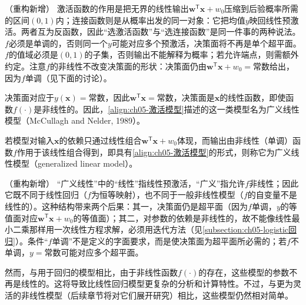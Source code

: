 \documentclass[../../main.tex]{subfiles}
\begin{document}
\begin{remark}（重构新增）
激活函数的作用是把无界的线性输出$\boldsymbol{w}^{\mathsf{T}}\boldsymbol{x}+w_0$压缩到后验概率所需的区间$(0,1)$内；连接函数则是从概率出发的同一对象：它把均值$y$映回线性预激活。两者互为反函数，因此“选激活函数”与“选连接函数”是同一件事的两种说法。$f$必须是单调的，否则同一个$y$可能对应多个预激活，决策面将不再是单个超平面。$f$的值域必须是$(0,1)$的子集，否则输出不能解释为概率；若允许端点，则需额外约定。注意$f$的非线性不改变决策面的形状：决策面仍由$\boldsymbol{w}^{\mathsf{T}}\boldsymbol{x}+w_0=\text{常数}$给出，因为$f$单调（见下面的讨论）。
\end{remark}

决策面对应于$y(\boldsymbol{x})=\text{常数}$，因此$\boldsymbol{w}^{\mathsf{T}}\boldsymbol{x}=\text{常数}$，决策面是$\boldsymbol{x}$的线性函数，即使函数$f(\cdot)$是非线性的。因此，\eqref{align:ch05-激活模型}描述的这一类模型名为广义线性模型（McCullagh and Nelder, 1989）。

\begin{definition}[广义线性模型]\label{definition:ch05-广义线性模型}
若模型对输入$\boldsymbol{x}$的依赖只通过线性组合$\boldsymbol{w}^{\mathsf{T}}\boldsymbol{x}+w_0$体现，而输出由非线性（单调）函数$f$作用于该线性组合得到，即具有\eqref{align:ch05-激活模型}的形式，则称它为广义线性模型（generalized linear model）。
\end{definition}

\begin{remark}（重构新增）
“广义线性”中的“线性”指线性预激活，“广义”指允许$f$非线性；因此它既不同于线性回归（$f$为恒等映射），也不同于一般非线性模型（$f$的自变量不是线性的）。这种结构带来两个后果：其一，决策面仍是超平面（因为$f$单调，$y$的等值面对应$\boldsymbol{w}^{\mathsf{T}}\boldsymbol{x}+w_0$的等值面）；其二，对参数的依赖是非线性的，故不能像线性最小二乘那样用一次线性方程求解，必须用迭代方法（见\cref{subsection:ch05-logistic回归}）。条件“$f$单调”不是定义的字面要求，而是使决策面为超平面所必需的；若$f$不单调，$y=\text{常数}$可能对应多个超平面。
\end{remark}

然而，与用于回归的模型相比，由于非线性函数$f(\cdot)$的存在，这些模型的参数不再是线性的。这将导致比线性回归模型更复杂的分析和计算特性。不过，与更为灵活的非线性模型（后续章节将对它们展开研究）相比，这些模型仍然相对简单。
\end{document}

